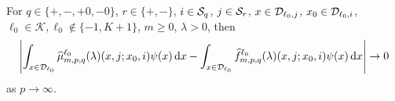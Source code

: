 \begin{cor}\label{cor: k}
	For \(q \in \{+,-,+0,-0\}\), \(r\in\{+,-\}\), \(i\in\mathcal{S}_q\), \(j\in\mathcal{S}_r\), \(x\in\mathcal{D}_{\ell_0,j}\), \(x_0\in\mathcal{D}_{\ell_0,i}\), \(\ell_0\in\mathcal K, \ell_0\notin\{-1,K+1\}\), \(m\geq 0\), \(\lambda > 0\), then 
	\begin{align}
		\left|\int_{x\in\mathcal{D}_{\ell_0}}\widehat \mu_{m,p,q}^{\ell_0}(\lambda)( x,j;x_0,i)\psi(x)\, \mathrm{d} x - \int_{x\in\mathcal{D}_{\ell_0}}\widehat f^{\ell_0}_{m,p,q}(\lambda)(x,j;x_0,i)\psi(x) \, \mathrm{d} x\right| \to 0 \label{eqnALKJV}
	\end{align}
	as \(p\to\infty\). 

\end{cor}
